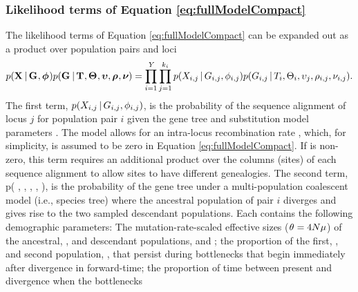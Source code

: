 \subsubsection{Likelihood terms of Equation \ref{eq:fullModelCompact}}
\begin{linenomath}
The likelihood terms of Equation \ref{eq:fullModelCompact} can
be expanded out as a product over population pairs and loci
\begin{equation}
    p(\alignmentVector \given \geneTreeVector, \hkyModelVector)
    p(\geneTreeVector \given \divTimeMapVector, \demographicParamVector,
    \locusMutationRateScalarVector, \ploidyScalarVector,
    \mutationRateScalarConstantVector) = 
    \prod_{i=1}^{\npairs{}}
    \prod_{j=1}^{\nloci{i}}
    p(\alignment{i}{j} \given \geneTree{i}{j}, \hkyModel{i}{j})
    p(\geneTree{i}{j} \given \divTimeMap{i}, \demographicParams{i},
    \locusMutationRateScalar{j}, \ploidyScalar{i}{j},
    \mutationRateScalarConstant{i}{j}).
    \label{eq:modelLikelihoodExpanded}
\end{equation}
The first term,
$p(\alignment{i}{j} \given \geneTree{i}{j}, \hkyModel{i}{j})$, is the
probability of the sequence alignment of locus $j$ for population pair $i$
given the gene tree and \hky \cite{HKY} substitution model parameters
\cite[i.e., the ``Felsenstein likelihood'']{Felsenstein1981}.
The model allows for an intra-locus recombination rate \recombinationRate,
which, for simplicity, is assumed to be zero in Equation
\ref{eq:fullModelCompact}.
If \recombinationRate is non-zero, this term requires an additional product
over the columns (sites) of each sequence alignment to allow sites to have
different genealogies.
The second term,
p( \given {}, ,
, ,
),
is the probability of the gene tree under a multi-population coalescent model
(i.e., species tree) where the ancestral population of pair $i$ diverges
and gives rise to the two sampled descendant populations.
Each \demographicParams{} contains the following demographic parameters: The
mutation-rate-scaled effective sizes ($\theta_{} = 4N\mu$) of the
ancestral, \ancestralTheta{}, and descendant populations, 
and ;
the proportion of the first, , and second population,
, that persist during bottlenecks that begin immediately
after divergence in forward-time;
the proportion of time between present and divergence when the bottlenecks

\end{linenomath}
